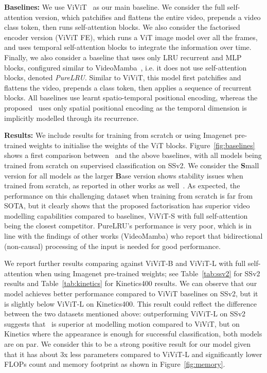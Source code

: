 \par \noindent \textbf{Baselines:}
We use ViViT~\citep{vivit} as our main baseline. We consider the full self-attention version, which patchifies and flattens the entire video, prepends a video class token, then runs self-attention blocks. We also consider the factorised encoder version (ViViT FE), which runs a ViT image model over all the frames, and uses temporal self-attention blocks to integrate the information over time. Finally, we also consider a baseline that uses only LRU recurrent and MLP blocks, configured similar to VideoMamba~\cite{li2024videomambastatespacemodel}, i.e. it does not use self-attention blocks, denoted \textit{PureLRU}. Similar to ViViT, this model first patchifies and flattens the video, prepends a class token, then applies a sequence of recurrent blocks. All baselines use learnt spatio-temporal positional encoding, whereas the proposed \ssm\ uses only spatial positional encoding as the temporal dimension is implicitly modelled through its recurrence.


\par \noindent \textbf{Results:} We include results for training from scratch or using Imagenet pre-trained weights to initialise the weights of the ViT blocks. Figure~\ref{fig:baselines} shows a first comparison between \ssm\ and the above baselines, with all models being trained from scratch on supervised classification on SSv2. We consider the \textbf{S}mall version for all models as the larger \textbf{B}ase version shows stability issues when trained from scratch, as reported in other works as well~\cite{li2024videomambastatespacemodel,vivit}. As expected, the performance on this challenging dataset when training from scratch is far from SOTA, but it clearly shows that the proposed factorisation has superior video modelling capabilities compared to baselines, ViViT-S with full self-attention being the closest competitor. PureLRU's performance is very poor, which is in line with the findings of other works (\eg VideoMamba) who report that bidirectional (non-causal) processing of the input is needed for good performance. 

We report further results comparing against ViViT-B and ViViT-L with full self-attention when using Imagenet pre-trained weights; see Table~\ref{tab:ssv2} for SSv2 results and Table~\ref{tab:kinetics} for Kinetics400 results.
We can observe that our model achieves better performance compared to ViViT baselines on SSv2, but it is slightly below ViViT-L on Kinetics400. This result could reflect the difference between the two datasets mentioned above: outperforming ViViT-L on SSv2 suggests that \ssm\ is superior at modelling motion compared to ViViT, but on Kinetics where the appearance is enough for successful classification, both models are on par. We consider this to be a strong positive result for our model given that it has about 3x less parameters compared to ViViT-L and significantly lower FLOPs count and memory footprint as shown in Figure~\ref{fig:memory}.


